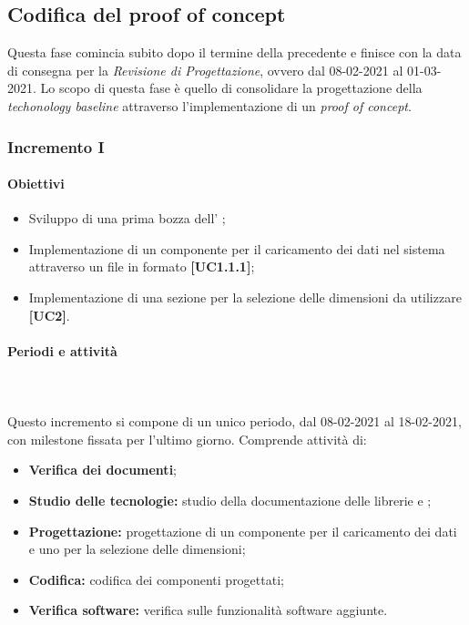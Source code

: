 \subsection{Codifica del proof of concept}
Questa fase comincia subito dopo il termine della precedente e finisce con la data di consegna per la \textit{Revisione di Progettazione}, ovvero dal 08-02-2021 al 01-03-2021. Lo scopo di questa fase è quello di consolidare la progettazione della \textit{techonology baseline} attraverso l'implementazione di un \textit{proof of concept}.
\subsubsection{Incremento I}
\paragraph{Obiettivi}
\begin{itemize}
\item Sviluppo di una prima bozza dell' ;
\item Implementazione di un componente per il caricamento dei dati nel sistema attraverso un file in formato  \textbf{[UC1.1.1]};
\item Implementazione di una sezione per la selezione delle dimensioni da utilizzare \textbf{[UC2]}.
\end{itemize}
		
\paragraph{Periodi e attività} \mbox{}\\\mbox{}\\
Questo incremento si compone di un unico periodo, dal 08-02-2021 al 18-02-2021, con milestone fissata per l'ultimo giorno. Comprende attività di:
\begin{itemize}
\item \textbf{Verifica dei documenti};
\item \textbf{Studio delle tecnologie:} studio della documentazione delle librerie  e ;
\item \textbf{Progettazione:} progettazione di un componente per il caricamento dei dati e uno per la selezione delle dimensioni;
\item \textbf{Codifica:} codifica dei componenti progettati;
\item \textbf{Verifica software:} verifica sulle funzionalità software aggiunte.
\end{itemize}

